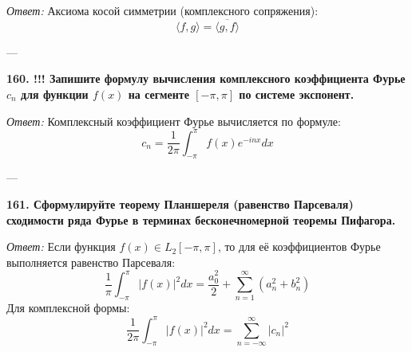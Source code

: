\documentclass{article}
\begin{document}
\textit{Ответ:} Аксиома косой симметрии (комплексного сопряжения):
$$ \langle f, g \rangle = \overline{\langle g, f \rangle} $$

---

\textbf{160. !!! Запишите формулу вычисления комплексного коэффициента Фурье $c_{n}$ для функции $f(x)$ на сегменте $[-\pi,\pi]$ по системе экспонент.}

\textit{Ответ:} Комплексный коэффициент Фурье вычисляется по формуле:
$$ c_n = \frac{1}{2\pi} \int_{-\pi}^{\pi} f(x) e^{-inx} dx $$

---

\textbf{161. Сформулируйте теорему Планшереля (равенство Парсеваля) сходимости ряда Фурье в терминах бесконечномерной теоремы Пифагора.}

\textit{Ответ:} Если функция $f(x) \in L_2[-\pi, \pi]$, то для её коэффициентов Фурье выполняется равенство Парсеваля:
$$ \frac{1}{\pi} \int_{-\pi}^{\pi} |f(x)|^2 dx = \frac{a_0^2}{2} + \sum_{n=1}^{\infty} (a_n^2 + b_n^2) $$
Для комплексной формы:
$$ \frac{1}{2\pi} \int_{-\pi}^{\pi} |f(x)|^2 dx = \sum_{n=-\infty}^{\infty} |c_n|^2 $$
\end{document}
